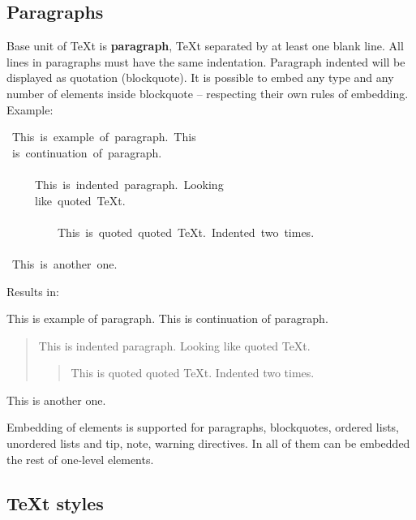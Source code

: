 \documentclass[12pt]{article}
\begin{document}
\subsection{Paragraphs}

Base unit of \TeX{}t is \textbf{paragraph}, \TeX{}t separated by at least one blank
line. All lines in paragraphs must have the same indentation. Paragraph
indented will be displayed as quotation (blockquote). It is possible to
embed any type and any number of elements inside blockquote -- respecting
their own rules of embedding. Example:

\begin{ttfamily}\begin{flushleft}
\mbox{~This~is~example~of~paragraph.~This}\\
\mbox{~is~continuation~of~paragraph.}\\
\mbox{}\\
\mbox{~~~~~This~is~indented~paragraph.~Looking}\\
\mbox{~~~~~like~quoted~\TeX{}t.}\\
\mbox{}\\
\mbox{~~~~~~~~~This~is~quoted~quoted~\TeX{}t.~Indented~two~times.}\\
\mbox{}\\
\mbox{~This~is~another~one.}\\
\end{flushleft}\end{ttfamily}

Results in:

This is example of paragraph. This
is continuation of paragraph.

 \begin{quotation}
 This is indented paragraph. Looking
 like quoted \TeX{}t.

 \begin{quotation}
 This is quoted quoted \TeX{}t. Indented two times.
 \end{quotation}
 \end{quotation}

This is another one.

Embedding of elements is supported for paragraphs, blockquotes, ordered
lists, unordered lists and tip, note, warning directives. In all of them
can be embedded the rest of one-level elements.

\hypertarget{lTeXt-styles}{}
\subsection{\TeX{}t styles}
\end{document}
